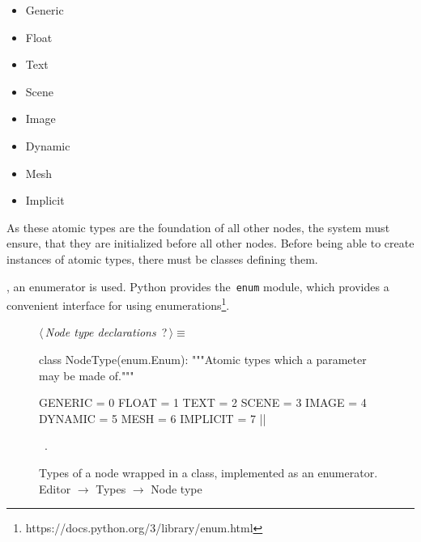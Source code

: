 \documentclass[%
    a4paper,    %
    justified,  %
    nobib,      %
    openany     %
]{tufte-book}
\begin{document}
\begin{itemize}
  \item{Generic}
  \item{Float}
  \item{Text}
  \item{Scene}
  \item{Image}
  \item{Dynamic}
  \item{Mesh}
  \item{Implicit}
\end{itemize}

As these atomic types are the foundation of all other nodes, the system must
ensure, that they are initialized before all other nodes. Before being able to
create instances of atomic types, there must be classes defining them.

, an enumerator is used.
Python provides the~\verb=enum= module, which provides a convenient interface
for using enumerations\footnote{https://docs.python.org/3/library/enum.html}.

\begin{figure}
\begin{flushleft} \small
\begin{minipage}{\linewidth}\label{scrap63}\raggedright\small
{} $\langle\,${\itshape Node type declarations}\nobreak\ {\footnotesize {?}}$\,\rangle\equiv$
\vspace{-1ex}
\begin{pythoncode}
class NodeType(enum.Enum):
    """Atomic types which a parameter may be made of."""

    GENERIC  = 0
    FLOAT    = 1
    TEXT     = 2
    SCENE    = 3
    IMAGE    = 4
    DYNAMIC  = 5
    MESH     = 6
    IMPLICIT = 7
|\NWsep|
\end{pythoncode}
\vspace{1.5ex}
\footnotesize
\begin{list}{}{\setlength{\itemsep}{-\parsep}\setlength{\itemindent}{-\leftmargin}}
\item \NWtxtMacroRefIn\ .

\item{}
\end{list}
\end{minipage}\vspace{4ex}
\end{flushleft}
\caption{Types of a node wrapped in a class, implemented as an enumerator.
  \newline{}\newline{}Editor $\rightarrow$ Types $\rightarrow$ Node type}
\label{editor:lst:types:node-type}
\end{figure}
\end{document}

